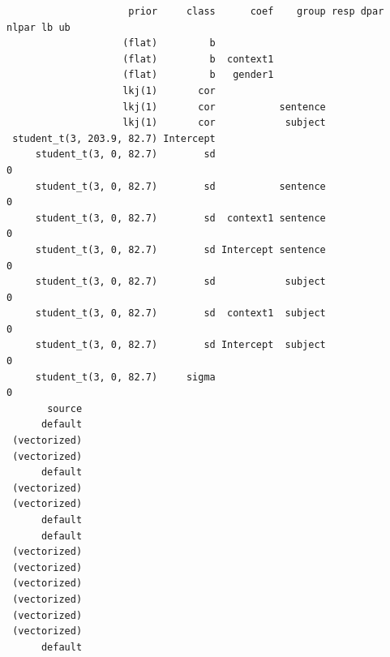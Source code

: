\documentclass[
  doc,
  floatsintext,
  longtable,
  nolmodern,
  notxfonts,
  notimes,
  colorlinks=true,linkcolor=blue,citecolor=blue,urlcolor=blue]{apa7}
\newenvironment{Shaded}{\begin{snugshade}}{\end{snugshade}}
\newcommand{\CommentTok}[1]{\textcolor[rgb]{0.37,0.37,0.37}{#1}}
\newcommand{\DecValTok}[1]{\textcolor[rgb]{0.68,0.00,0.00}{#1}}
\newcommand{\FloatTok}[1]{\textcolor[rgb]{0.68,0.00,0.00}{#1}}
\newcommand{\FunctionTok}[1]{\textcolor[rgb]{0.28,0.35,0.67}{#1}}
\newcommand{\NormalTok}[1]{\textcolor[rgb]{0.00,0.23,0.31}{#1}}
\newcommand{\OtherTok}[1]{\textcolor[rgb]{0.00,0.23,0.31}{#1}}
\newcommand{\SpecialCharTok}[1]{\textcolor[rgb]{0.37,0.37,0.37}{#1}}
\begin{document}
\begin{Shaded}
\end{Shaded}

\begin{verbatim}
                     prior     class      coef    group resp dpar nlpar lb ub
                    (flat)         b                                         
                    (flat)         b  context1                               
                    (flat)         b   gender1                               
                    lkj(1)       cor                                         
                    lkj(1)       cor           sentence                      
                    lkj(1)       cor            subject                      
 student_t(3, 203.9, 82.7) Intercept                                         
     student_t(3, 0, 82.7)        sd                                     0   
     student_t(3, 0, 82.7)        sd           sentence                  0   
     student_t(3, 0, 82.7)        sd  context1 sentence                  0   
     student_t(3, 0, 82.7)        sd Intercept sentence                  0   
     student_t(3, 0, 82.7)        sd            subject                  0   
     student_t(3, 0, 82.7)        sd  context1  subject                  0   
     student_t(3, 0, 82.7)        sd Intercept  subject                  0   
     student_t(3, 0, 82.7)     sigma                                     0   
       source
      default
 (vectorized)
 (vectorized)
      default
 (vectorized)
 (vectorized)
      default
      default
 (vectorized)
 (vectorized)
 (vectorized)
 (vectorized)
 (vectorized)
 (vectorized)
      default
\end{verbatim}
\end{document}
